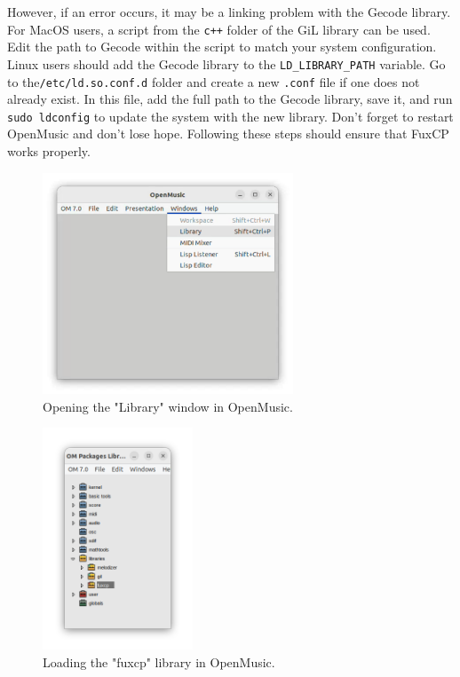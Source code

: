 However, if an error occurs, it may be a linking problem with the Gecode library. For MacOS users, a script from the \texttt{c++} folder of the GiL library can be used. Edit the path to Gecode within the script to match your system configuration. Linux users should add the Gecode library to the \texttt{LD\_LIBRARY\_PATH} variable. Go to the\newline \texttt{/etc/ld.so.conf.d} folder and create a new \texttt{.conf} file if one does not already exist. In this file, add the full path to the Gecode library, save it, and run \texttt{sudo ldconfig} to update the system with the new library. Don't forget to restart OpenMusic and don't lose hope. Following these steps should ensure that FuxCP works properly.

\begin{figure}[h]
    \centering
    \includegraphics[height=2.6in]{Images/openmusic_library.png}
    \caption{Opening the "Library" window in OpenMusic.}
    \label{fig:library}
\end{figure}
\begin{figure}[h]
    \centering
    \includegraphics[height=2.6in]{Images/openmusic_load.png}
    \caption{Loading the "fuxcp" library in OpenMusic.}
    \label{fig:load}
\end{figure}

